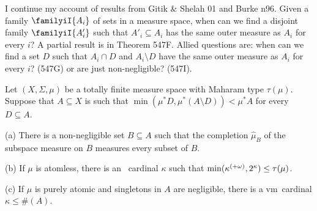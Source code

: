 
\def\chaptername{Real-valued-measurable cardinals}
\def\sectionname{Disjoint refinements of sequences of sets}


I continue my account of results from {\smc Gitik \& Shelah 01} and
{\smc Burke n96}.   Given a family $\familyiI{A_i}$ of sets
in a measure space, when can we find a disjoint family $\familyiI{A'_i}$
such that $A'_i\subseteq A_i$ has the same outer measure as $A_i$ for
every $i$?   A partial result is in Theorem 547F.   Allied questions are:
when can we find a set $D$ such that $A_i\cap D$ and $A_i\setminus D$ have
the same outer measure as $A_i$ for every $i$?  (547G) or are just
non-negligible?  (547I).

 Let $(X,\Sigma,\mu)$ be a totally finite
measure space with Maharam type $\tau(\mu)$.   Suppose that
$A\subseteq X$ is such that $\min(\mu^*D,\mu^*(A\setminus D))<\mu^*A$ for
every $D\subseteq A$.

(a) There is a non-negligible set $B\subseteq A$ such that the completion
$\hat\mu_B$ of the subspace measure on $B$ measures every subset of $B$.

(b) If $\mu$ is atomless, there is an \am\ cardinal $\kappa$ such that
$\min(\kappa^{(+\omega)},2^{\kappa})\penalty-100\le\tau(\mu)$.

(c) If $\mu$ is purely atomic and singletons in $A$ are negligible,
there is a \2vm\ cardinal $\kappa\le\#(A)$.

